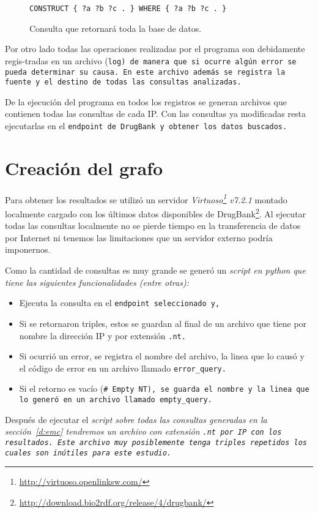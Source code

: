 \begin{figure}[ht]
  \centering
  \tt{CONSTRUCT \{ ?a ?b ?c . \} WHERE \{ ?a ?b ?c . \}}
  \caption{Consulta que retornará toda la base de datos.}\label{fig:exbigq}
\end{figure}

Por otro lado todas las operaciones realizadas por el programa son debidamente
regis-tradas en un archivo (\tt{log}) de manera que si ocurre algún error se
pueda determinar su causa. En este archivo además se registra la fuente y el
destino de todas las consultas analizadas.

De la ejecución del programa en todos los registros se generan 
archivos que contienen todas las consultas de cada IP. Con las
consultas ya modificadas resta ejecutarlas en el \tt{endpoint} de DrugBank y
obtener los datos buscados.

\section{Creación del grafo}\label{d:cg}
Para obtener los resultados se utilizó un servidor
\emph{Virtuoso\footnote{\url{http://virtuoso.openlinksw.com/}} v7.2.1} montado 
localmente cargado con los últimos datos disponibles de
DrugBank\footnote{\url{http://download.bio2rdf.org/release/4/drugbank/}}.
Al ejecutar todas las consultas localmente no se pierde tiempo en la
transferencia de datos por Internet ni tenemos las limitaciones que un servidor
externo podría imponernos. 

Como la cantidad de consultas es muy grande se generó un \it{script} en
\it{python} que tiene las siguientes funcionalidades (entre otras):
\begin{itemize}
  \item
    Ejecuta la consulta en el \tt{endpoint} seleccionado y,
  \item
    Si se retornaron triples, estos se guardan al final de un archivo que tiene
    por nombre la dirección IP y por extensión \tt{.nt}.
  \item
    Si ocurrió un error, se registra el nombre del archivo, la linea que lo
    causó y el código de error en un archivo llamado \tt{error\_query}.
  \item
    Si el retorno es vacío (\tt{\# Empty NT}), se guarda el nombre y la linea que
    lo generó en un archivo llamado \tt{empty\_query}.
\end{itemize}

Después de ejecutar el \it{script} sobre todas las consultas generadas en la
sección~\ref{d:emc} tendremos un archivo con extensión \tt{.nt} por IP
con los resultados.
Este archivo muy posiblemente tenga triples repetidos los cuales son inútiles
para este estudio.

